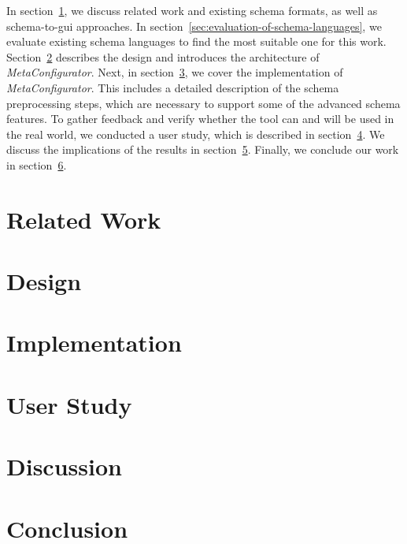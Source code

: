 \documentclass[lettersize,journal]{IEEEtran}
\newcommand{\toolname}{\textit{MetaConfigurator}}
\begin{document}
 In section~\ref{sec:research}, we discuss related work and existing schema formats, as well as schema-to-gui approaches.
 In section~\ref{sec:evaluation-of-schema-languages}, we evaluate existing schema languages to find the most suitable one for this work.
 Section~\ref{sec:design} describes the design and introduces the architecture of \toolname{}.
 Next, in section~\ref{sec:implementation}, we cover the implementation of \toolname{}.
 This includes a detailed description of the schema preprocessing steps, which are necessary to support some of the advanced schema features.
 To gather feedback and verify whether the tool can and will be used in the real world, we conducted a user study, which is described in section~\ref{sec:user_study}.
 We discuss the implications of the results in section~\ref{sec:discussion}.
 Finally, we conclude our work in section~\ref{sec:conclusion}.


 \section{Related Work}\label{sec:research}
 


 \section{Design}\label{sec:design}
 


 \section{Implementation}\label{sec:implementation}
 

 \section{User Study}\label{sec:user_study}
 


 \section{Discussion}\label{sec:discussion} %

 


 \section{Conclusion}\label{sec:conclusion} %
\end{document}
